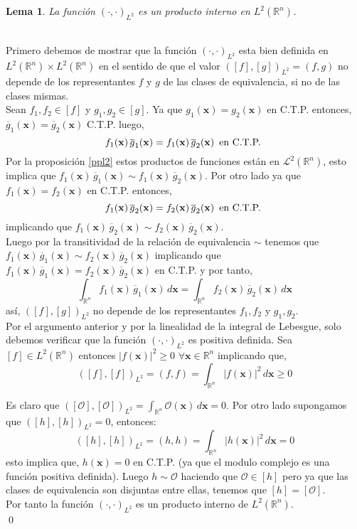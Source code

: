 \documentclass[12pt]{book}
\numberwithin{equation}{chapter}
\newtheorem{lemma}[theorem]{Lema}
\def\n{\noindent}
\def\ol{\overline}
\def\R{\mathbb{R}}
\def\L{\mathcal{L}}
\def\x{\mathbf{x}}
\begin{document}
\begin{lemma}
La funci\'on $(\cdot , \cdot)_{L^{2}} $ es un producto interno en $L^{2}(\R^{n})$.
\end{lemma}
\n {\bf Demostraci\'on}\\
Primero debemos de mostrar que la funci\'on $(\cdot , \cdot)_{L^{2}}$ esta bien definida en $L^{2}(\R^{n}) \times L^{2}(\R^{n})$ en el sentido de que el valor $([f],[g])_{L^{2}}=(f,g) $ no depende de los representantes $f$ y $g$ de las clases de equivalencia, si no de las clases mismas.\\
Sean $f_{1},f_{2} \in [f]$ y $g_{1},g_{2} \in [g]$. Ya que $g_{1}(\x)= g_{2}(\x)$ en C.T.P. entonces, $ \ol{g}_{1}(\x)= \ol{g}_{2}(\x) $ C.T.P. luego,
$$ f_{1}(\x)\, \ol{g}_{1}(\x) = f_{1}(\x)\, \ol{g}_{2}(\x) \, \hbox{ en C.T.P. } $$ 
Por la proposici\'on \ref{ppl2} estos productos de funciones est\'an en $\L^{2}(\R^{n})$, esto implica que $ f_{1}(\x)\, \ol{g}_{1}(\x) \sim f_{1}(\x)\, \ol{g}_{2}(\x)$. Por otro lado ya que $f_{1}(\x)= f_{2}(\x)$ en C.T.P. entonces,
$$ f_{1}(\x)\, \ol{g}_{2}(\x) = f_{2}(\x)\, \ol{g}_{2}(\x) \, \hbox{ en C.T.P. } $$
implicando que $f_{1}(\x)\, \ol{g}_{2}(\x) \sim f_{2}(\x)\, \ol{g}_{2}(\x)$.\\ 
Luego por la transitividad de la relaci\'on de equivalencia $\sim$ tenemos que $ f_{1}(\x)\, \ol{g}_{1}(\x) \sim f_{2}(\x)\, \ol{g}_{2}(\x) $ implicando que $f_{1}(\x)\, \ol{g}_{1}(\x) = f_{2}(\x)\, \ol{g}_{2}(\x)$ en C.T.P. y por tanto,
$$ \int_{\R^{n}} f_{1}(\x)\, \ol{g}_{1}(\x) \, d\x = \int_{\R^{n}} f_{2}(\x)\, \ol{g}_{2}(\x) \, d\x$$
as\'i, $ ([f],[g])_{L^{2}}$ no depende de los representantes $f_{1},f_{2}$ y $g_{1},g_{2}$.\\
Por el argumento anterior y por la linealidad de la integral de Lebesgue, solo debemos verificar que la funci\'on $( \cdot , \cdot )_{L^{2}}$ es positiva definida. Sea $ [f] \in L^{2}(\R^{n}) $ entonces $|f(\x)|^{2} \geq 0$ $\forall \x \in \R^{n}$ implicando que,
$$ ([f],[f])_{L^{2}}=(f,f)= \int_{\R^{n}} |f(\x)|^{2} \, d\x \geq 0 $$

Es claro que $([\mathcal{O}],[\mathcal{O}])_{L^{2}} = \int_{\R^{n}} \mathcal{O}(\x) \, d\x=0  $. Por otro lado supongamos que $([h],[h])_{L^{2}}=0$, entonces:
$$ ([h],[h])_{L^{2}}= (h,h)= \int_{\R^{n}} |h(\x)|^{2} \, d\x =0$$ 
esto implica que, $h(\x)=0$ en C.T.P. (ya que el modulo complejo es una funci\'on positiva definida). Luego $h \sim \mathcal{O}$ haciendo que $\mathcal{O} \in [h]$ pero ya que las clases de equivalencia son disjuntas entre ellas, tenemos que $[h]=[\mathcal{O}]$.\\
Por tanto la funci\'on $(\cdot , \cdot)_{L^{2}}$ es un producto interno de $L^{2}(\R^{n})$. \\ \qed
\end{document}
